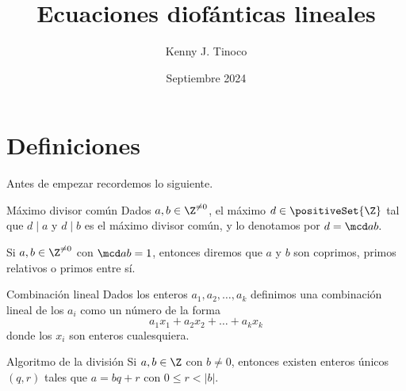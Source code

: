 \documentclass[12pt]{article}
\title{Ecuaciones diofánticas lineales}
\author{Kenny J. Tinoco}
\date{Septiembre 2024}
\begin{document}
    \maketitle
    \section{Definiciones}

    Antes de empezar recordemos lo siguiente.

    \begin{definition.box}{Máximo divisor común}{}
        Dados $a,b \in \Z^{\neq 0}$, el máximo $d \in \positiveSet{\Z}$ tal que $d \mid a$ y $d \mid b$ es el máximo divisor común,
        y lo denotamos por $d = \mcd a b.$
    \end{definition.box}

    \begin{definition.box}{}{}
        Si $a,b \in \Z^{\neq 0}$ con $\mcd a b = 1$, entonces diremos que $a$ y $b$ son coprimos, primos relativos o primos entre sí.
    \end{definition.box}

    \begin{definition.box}{Combinación lineal}{}
        Dados los enteros $a_1, a_2, \ldots, a_k$ definimos una combinación lineal de los $a_i$ como un número de la forma
        \[
            a_1 x_1 + a_2 x_2 + \ldots + a_k x_k
        \]
        donde los $x_i$ son enteros cualesquiera.
    \end{definition.box}

    \begin{theorem.box}{Algoritmo de la división}{}
        Si $a, b \in \Z$ con $b \neq 0$, entonces existen enteros únicos $(q,r)$ tales que $a = bq + r$ con $0 \leq r < |b|$.
    \end{theorem.box}
\end{document}
